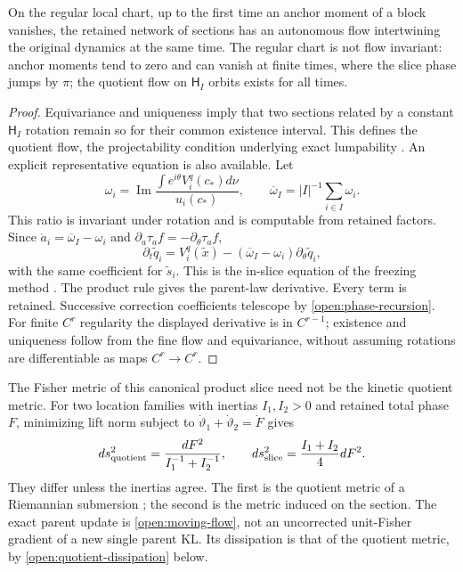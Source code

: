 On the regular local chart, up to the first time an anchor moment of a block vanishes, the retained network of sections has an autonomous flow intertwining the original dynamics at the same time. The regular chart is not flow invariant: anchor moments tend to zero and can vanish at finite times, where the slice phase jumps by $\pi$; the quotient flow on $\mathsf H_I$ orbits exists for all times.
\begin{proof}
Equivariance and uniqueness imply that two sections related by a constant $\mathsf H_I$ rotation remain so for their common existence interval. This defines the quotient flow, the projectability condition underlying exact lumpability \citep{HorstmeyerAtay2016}. An explicit representative equation is also available. Let
\begin{equation}
\omega_i=\operatorname{Im}
\frac{\int e^{i\theta}V_i^q(c_*)d\nu}{u_i(c_*)},
\qquad
\overline\omega_I=|I|^{-1}\sum_{i\in I}\omega_i.
\end{equation}
This ratio is invariant under rotation and is computable from retained factors. Since $\dot a_i=\overline\omega_I-\omega_i$ and $\partial_a\tau_af=-\partial_\theta\tau_af$,
\begin{equation}
\partial_t\widetilde q_i
=V_i^q(\widetilde x)
-(\overline\omega_I-\omega_i)\partial_\theta\widetilde q_i,
\label{open:moving-flow}
\end{equation}
with the same coefficient for $\widetilde s_i$. This is the in-slice equation of the freezing method \citep{BeynThummler2004}. The product rule gives the parent-law derivative. Every term is retained. Successive correction coefficients telescope by \cref{open:phase-recursion}. For finite $C^r$ regularity the displayed derivative is in $C^{r-1}$; existence and uniqueness follow from the fine flow and equivariance, without assuming rotations are differentiable as maps $C^r\to C^r$.
\end{proof}

The Fisher metric of this canonical product slice need not be the kinetic quotient metric. For two location families with inertias $I_1,I_2>0$ and retained total phase $F$, minimizing lift norm subject to $\dot\vartheta_1+\dot\vartheta_2=\dot F$ gives
\begin{equation}
ds_{\rm quotient}^2=\frac{dF^2}{I_1^{-1}+I_2^{-1}},
\qquad
ds_{\rm slice}^2=\frac{I_1+I_2}{4}dF^2.
\label{open:two-metrics}
\end{equation}
They differ unless the inertias agree. The first is the quotient metric of a Riemannian submersion \citep{ONeill1966}; the second is the metric induced on the section. The exact parent update is \cref{open:moving-flow}, not an uncorrected unit-Fisher gradient of a new single parent KL. Its dissipation is that of the quotient metric, by \cref{open:quotient-dissipation} below.

